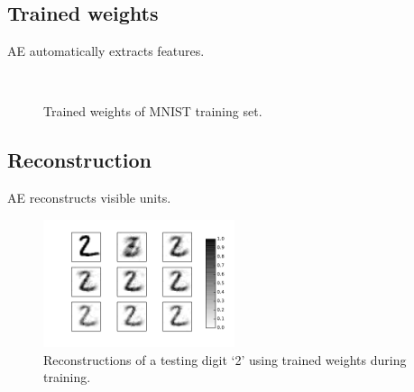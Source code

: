 \documentclass{article}
\begin{document}
\subsection{Trained weights}
AE automatically extracts features.
\begin{figure}
	\\
	\caption{Trained weights of MNIST training set.}
\end{figure}

\subsection{Reconstruction}
AE reconstructs visible units.
\begin{figure}
	\centering
	\includegraphics[width=0.5\textwidth]{recon_digit}
	\caption{Reconstructions of a testing digit `2' using trained weights during training.}
	\label{fig:recon}		
\end{figure}
\end{document}
